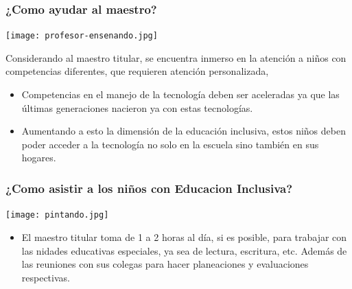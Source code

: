 \documentclass[11pt]{beamer}
\begin{document}
\begin{frame}
\frametitle{¿Como ayudar al maestro?}
    \justify
    \begin{minipage}[c]{0.4\textwidth} 
    \texttt{[image: profesor-ensenando.jpg]} 
    \end{minipage}
    \begin{minipage}[c]{0.55\textwidth}
            Considerando al maestro titular, se encuentra inmerso en la atención a niños con competencias diferentes, que requieren atención personalizada, 


        \begin{itemize}

        \item Competencias en el manejo de la tecnología deben ser aceleradas ya que las últimas generaciones nacieron ya con estas tecnologías.
        \item Aumentando a esto la dimensión de la educación inclusiva, estos niños deben poder acceder a la tecnología no solo en la escuela sino también en sus hogares.


        \end{itemize}

    \end{minipage}
\end{frame}

\begin{frame}
\frametitle{¿Como asistir a los niños con Educacion Inclusiva?}
    \justify
    \begin{minipage}[c]{0.4\textwidth} 
    \texttt{[image: pintando.jpg]} 
    \end{minipage}
    \begin{minipage}[c]{0.55\textwidth}
        \begin{itemize}
        \item El maestro titular toma de 1 a 2 horas al día, si es posible, para trabajar con las nidades educativas especiales, ya sea de lectura, escritura, etc. Además de las reuniones con sus colegas para hacer planeaciones y evaluaciones respectivas.
        \end{itemize}

    \end{minipage}
\end{frame}
\end{document}
